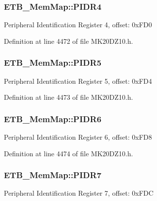 \subsubsection[{\texorpdfstring{P\+I\+D\+R4}{PIDR4}}]{ E\+T\+B\+\_\+\+Mem\+Map\+::\+P\+I\+D\+R4}\hypertarget{struct_e_t_b___mem_map_aab4e4aba29d9ec426e0f2e218903a4f0}{}\label{struct_e_t_b___mem_map_aab4e4aba29d9ec426e0f2e218903a4f0}
Peripheral Identification Register 4, offset\+: 0x\+F\+D0 

Definition at line 4472 of file M\+K20\+D\+Z10.\+h.

\subsubsection[{\texorpdfstring{P\+I\+D\+R5}{PIDR5}}]{ E\+T\+B\+\_\+\+Mem\+Map\+::\+P\+I\+D\+R5}\hypertarget{struct_e_t_b___mem_map_a29dbd40dd92aaf2fc1674f9f38ef1a5e}{}\label{struct_e_t_b___mem_map_a29dbd40dd92aaf2fc1674f9f38ef1a5e}
Peripheral Identification Register 5, offset\+: 0x\+F\+D4 

Definition at line 4473 of file M\+K20\+D\+Z10.\+h.

\subsubsection[{\texorpdfstring{P\+I\+D\+R6}{PIDR6}}]{ E\+T\+B\+\_\+\+Mem\+Map\+::\+P\+I\+D\+R6}\hypertarget{struct_e_t_b___mem_map_aa7b42abfbe48ecbae7727e614304f2e5}{}\label{struct_e_t_b___mem_map_aa7b42abfbe48ecbae7727e614304f2e5}
Peripheral Identification Register 6, offset\+: 0x\+F\+D8 

Definition at line 4474 of file M\+K20\+D\+Z10.\+h.

\subsubsection[{\texorpdfstring{P\+I\+D\+R7}{PIDR7}}]{ E\+T\+B\+\_\+\+Mem\+Map\+::\+P\+I\+D\+R7}\hypertarget{struct_e_t_b___mem_map_afe2e7e50c2713a52cce9a89e6dcb0e1c}{}\label{struct_e_t_b___mem_map_afe2e7e50c2713a52cce9a89e6dcb0e1c}
Peripheral Identification Register 7, offset\+: 0x\+F\+DC 

